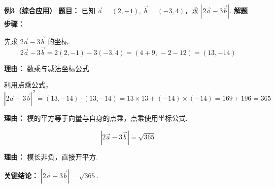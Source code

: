 \begin{examplebox}
	\medskip
	\textbf{\textcolor{CExample}{例3（综合应用）}}
	\textbf{\textcolor{CExample}{题目：}}
	已知 $\vec{a}=(2,-1)$, $\vec{b}=(-3,4)$，求 $|2\vec{a}-3\vec{b}|$.
	\textbf{\textcolor{CExample}{解题步骤：}}
	\begin{description}[style=nextline, leftmargin=2.8em, labelsep=0.5em, itemsep=0.45em]
		\item[\textbf{第一步（计算向量坐标）：}]
			先求 $2\vec{a}-3\vec{b}$ 的坐标.
			\[
				2\vec{a}-3\vec{b}=2(2,-1)-3(-3,4)=(4+9,\,-2-12)=(13,-14)
			\]
			\par\textbf{理由：} 数乘与减法坐标公式.
		\item[\textbf{第二步（计算模的平方）：}]
			利用点乘公式，
			\[
				|2\vec{a}-3\vec{b}|^2 = (13,-14)\cdot(13,-14)=13\times13+(-14)\times(-14)=169+196=365
			\]
			\par\textbf{理由：} 模的平方等于向量与自身的点乘，点乘使用坐标公式.
		\item[\textbf{第三步（开方得模）：}]
			\[
				|2\vec{a}-3\vec{b}| = \sqrt{365}
			\]
			\par\textbf{理由：} 模长非负，直接开平方.
	\end{description}
	\textbf{\textcolor{CExample}{关键结论：}}
	$\boxed{|2\vec{a}-3\vec{b}|=\sqrt{365}}$.
\end{examplebox}
